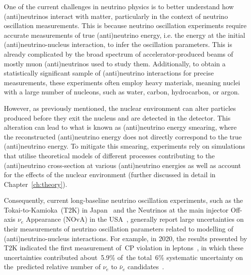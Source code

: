 
One of the current challenges in neutrino physics is to better understand how (anti)neu\-trinos interact with matter, particularly in the context of neutrino oscillation measurements. This is because neutrino oscillation experiments require accurate measurements of true (anti)neutrino energy, i.e. the energy at the initial (anti)neutrino-nucleus interaction, to infer the oscillation parameters. This is already complicated by the broad spectrum of accelerator-produced beams of mostly muon (anti)neutrinos used to study them. Additionally, to obtain a statistically significant sample of (anti)neutrino interactions for precise measurements, these experiments often employ heavy materials, meaning nuclei with a large number of nucleons, such as water, carbon, hydrocarbon, or argon.

However, as previously mentioned, the nuclear environment can alter particles produced before they exit the nucleus and are detected in the detector. This alteration can lead to what is known as (anti)neutrino energy smearing, where the reconstructed (anti)neutrino energy does not directly correspond to the true (anti)neutrino energy. To mitigate this smearing, experiments rely on simulations that utilise theoretical models of different processes contributing to the (anti)neutrino cross-section at various (anti)neutrino energies as well as account for the effects of the nuclear environment (further discussed in detail in Chapter~\ref{ch:theory}).

Consequently, current long-baseline neutrino oscillation experiments, such as the Tokai-to-Kamioka~(T2K) in Japan~\cite{t2k_ABE2011106} and the Neutrinos at the main injector Off-axis $\nu_e$ Appearance (NOvA) in the USA~\cite{NOvA:2007rmc}, generally report large uncertainties on their measurements of neutrino oscillation parameters related to modelling of (anti)neutrino-nucleus interactions. For example, in 2020, the results presented by T2K indicated the first measurement of~CP violation in leptons~\cite{Abe2020}, in which these uncertainties contributed about~5.9\% of~the total~6\% systematic uncertainty on the~predicted relative number of $\nu_e$ to $\bar{\nu}_e$
\mbox{candidates~\cite{Abe2020}}.


